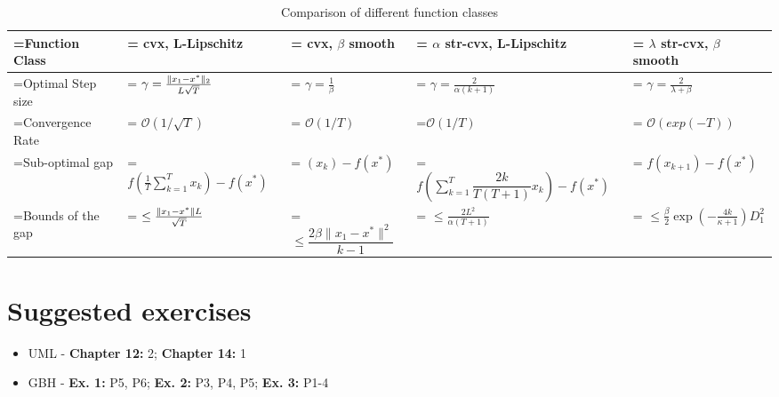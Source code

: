 \documentclass{article}
\DeclarePairedDelimiter{\norm}{\lVert}{\rVert}
\begin{document}
\begin{table}[h]
\footnotesize
\renewcommand{\arraystretch}{1.8}
\centering
    \caption{Comparison of different function classes}
    \begin{tabularx}{\columnwidth}{|>{\hsize=0.8\hsize\linewidth=\hsize}X|>{\hsize=1.1\hsize\linewidth=\hsize}X|>{\hsize=0.8\hsize\linewidth=\hsize}X|>{\hsize=1.3\hsize\linewidth=\hsize}X|>{\hsize=1\hsize\linewidth=\hsize}X|}
        \hline
        Function Class & cvx, L-Lipschitz & cvx, $\beta$ smooth & $\alpha$ str-cvx, L-Lipschitz & $\lambda$ str-cvx, $\beta$ smooth \\
        \hline
        Optimal Step size & $\gamma = \frac{\norm{x_1 - x^\ast}_2}{L \sqrt{T}}$ & $\gamma = \frac{1}{\beta}$ & $\gamma = \frac{2}{\alpha (k+1)}$ & $\gamma = \frac{2}{\lambda + \beta}$ \\
        Convergence Rate     & $\mathcal{O}(1/\sqrt{T})$ & $\mathcal{O}(1/{T})$ &$\mathcal{O}(1/{T})$ & $\mathcal{O}(exp(-T))$    \\
        Sub-optimal gap       & $
f\left(\frac{1}{T}\sum_{k=1}^T x_k\right)-f(x^*)$ & $(x_{k}) - f(x^{*})$ & {\tiny $f\left(\sum_{k=1}^T \dfrac{2k}{T(T+1)} x_k \right)-f(x^{*})$ }& $f(x_{k+1}) - f(x^{*})$  \\
        Bounds of the gap & $\leq \frac{\norm{x_1 - x^\ast}L}{\sqrt{T}}$ & $\leq \dfrac{2 \beta \| x_1 - x^{*} \|^2}{k-1}$ & $ \leq \frac{2 L^2}{\alpha(T+1)} $ &  $\leq \frac{\beta}{2} \exp \left( -\frac{4k}{\kappa + 1} \right) D_1^2$ \\

        \hline
    \end{tabularx}
    \label{table: simulation parameters}
\end{table}


\section*{Suggested exercises}

\begin{itemize}
    \item UML \cite{Shalev-Shwartz:2014:UML:2621980} - \textbf{Chapter 12:} 2; \textbf{Chapter 14:} 1
    \item GBH \cite{Gower} - \textbf{Ex. 1:} P5, P6; \textbf{Ex. 2:} P3, P4, P5; \textbf{Ex. 3:} P1-4
\end{itemize}




\end{document}
